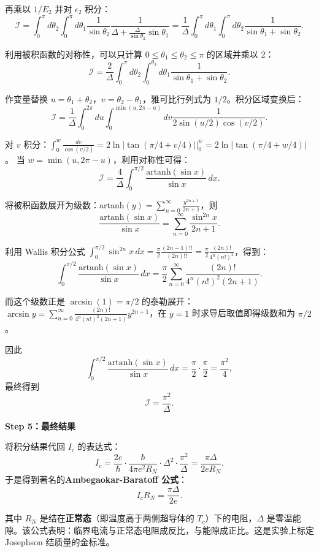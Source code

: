 再乘以 $1/E_2$ 并对 $\epsilon_2$ 积分：
\[
\mathcal{I} = \int_0^{\pi} d\theta_2 \int_0^{\pi} d\theta_1 \frac{1}{\sin\theta_2} \frac{1}{\Delta + \frac{\Delta}{\sin\theta_2}\sin\theta_1}
= \frac{1}{\Delta} \int_0^{\pi} d\theta_1 \int_0^{\pi} d\theta_2 \frac{1}{\sin\theta_1 + \sin\theta_2}.
\]

利用被积函数的对称性，可以只计算 $0 \le \theta_1 \le \theta_2 \le \pi$ 的区域并乘以 2：
\[
\mathcal{I} = \frac{2}{\Delta} \int_0^{\pi} d\theta_2 \int_0^{\theta_2} d\theta_1 \frac{1}{\sin\theta_1 + \sin\theta_2}.
\]

作变量替换 $u = \theta_1 + \theta_2$，$v = \theta_2 - \theta_1$，雅可比行列式为 $1/2$。积分区域变换后：
\[
\mathcal{I} = \frac{1}{\Delta} \int_0^{2\pi} du \int_0^{\min(u, 2\pi-u)} dv \frac{1}{2\sin(u/2)\cos(v/2)}.
\]

对 $v$ 积分：$\int_0^{w} \frac{dv}{\cos(v/2)} = 2\ln|\tan(\pi/4 + v/4)|\big|_0^w = 2\ln|\tan(\pi/4 + w/4)|$。
当 $w = \min(u, 2\pi-u)$，利用对称性可得：
\[
\mathcal{I} = \frac{4}{\Delta} \int_0^{\pi/2} \frac{\text{artanh}(\sin x)}{\sin x}\, dx.
\]

将被积函数展开为级数：$\text{artanh}(y) = \sum_{n=0}^{\infty} \frac{y^{2n+1}}{2n+1}$，则
\[
\frac{\text{artanh}(\sin x)}{\sin x} = \sum_{n=0}^{\infty} \frac{\sin^{2n} x}{2n+1}.
\]

利用 Wallis 积分公式 $\int_0^{\pi/2} \sin^{2n} x\, dx = \frac{\pi}{2} \frac{(2n-1)!!}{(2n)!!} = \frac{\pi}{2} \frac{(2n)!}{4^n (n!)^2}$，得到：
\[
\int_0^{\pi/2} \frac{\text{artanh}(\sin x)}{\sin x}\, dx = \frac{\pi}{2} \sum_{n=0}^{\infty} \frac{(2n)!}{4^n (n!)^2 (2n+1)}.
\]

而这个级数正是 $\arcsin(1) = \pi/2$ 的泰勒展开：$\arcsin y = \sum_{n=0}^{\infty} \frac{(2n)!}{4^n (n!)^2 (2n+1)} y^{2n+1}$，在 $y=1$ 时求导后取值即得级数和为 $\pi/2$。

因此
\[
\int_0^{\pi/2} \frac{\text{artanh}(\sin x)}{\sin x}\, dx = \frac{\pi}{2} \cdot \frac{\pi}{2} = \frac{\pi^2}{4},
\]
最终得到
\[
\boxed{\mathcal{I} = \frac{\pi^2}{\Delta}}.
\]

\textbf{Step 5：最终结果}

将积分结果代回 $I_c$ 的表达式：
\[
I_c = \frac{2e}{\hbar} \cdot \frac{\hbar}{4\pi e^2 R_N} \cdot \Delta^2 \cdot \frac{\pi^2}{\Delta}
= \frac{\pi\Delta}{2e R_N}.
\]
于是得到著名的\textbf{Ambegaokar-Baratoff 公式}：
\[
\boxed{I_c R_N = \frac{\pi\Delta}{2e}}.
\]

其中 $R_N$ 是结在\textbf{正常态}（即温度高于两侧超导体的 $T_c$）下的电阻，$\Delta$ 是零温能隙。该公式表明：临界电流与正常态电阻成反比，与能隙成正比。这是实验上标定 Josephson 结质量的金标准。

